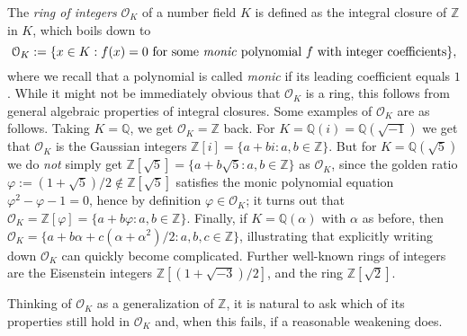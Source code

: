 \documentclass[a4paper,USenglish,cleveref, autoref, thm-restate]{lipics-v2021}
\newcommand*{\OK}[1][K]{\mathcal{O}_{#1}}
\newcommand{\Q}{\mathbb{Q}}
\newcommand{\Z}{\mathbb{Z}}
\begin{document}
The \emph{ring of integers} $\OK$ of a number field $K$ is defined as the integral closure of $\Z$ in $K$, which boils down to
\[
  \OK := \{x \in K : f(x)=0 \text{ for some \emph{monic} polynomial } f \text{ with integer coefficients}\},\]
where we recall that a polynomial is called \emph{monic} if its leading coefficient equals $1$.
While it might not be immediately obvious that $\OK$ is a ring, this follows from general algebraic properties of integral closures.
Some examples of $\OK$ are as follows. Taking $K=\Q$, we get $\OK=\Z$ back.
For $K=\Q(i)=\Q(\sqrt{-1})$ we get that $\OK$ is the Gaussian integers $\Z[i]=\{a+bi : a,b \in \Z\}$.
But for $K=\Q(\sqrt{5})$ we do \emph{not} simply get $\Z[\sqrt{5}]=\{a+b\sqrt{5} : a,b \in \Z\}$ as $\OK$, since the golden ratio $\varphi:=(1+\sqrt{5})/2\not\in \Z[\sqrt{5}]$ satisfies the monic polynomial equation $\varphi^2-\varphi-1=0$, hence by definition $\varphi \in \OK$; it turns out that $\OK=\Z[\varphi]=\{a+b\varphi : a,b \in \Z\}$. %
Finally, if $K=\Q(\alpha)$ with $\alpha$ as before, then $\OK=\{a+b \alpha+c (\alpha+\alpha^2)/2 : a,b,c \in \Z\}$, illustrating that explicitly writing down $\OK$ can quickly become complicated.
Further well-known rings of integers are %
the Eisenstein integers $\Z[(1+\sqrt{-3})/2]$, and the %
ring $\Z[\sqrt{2}]$.

Thinking of $\OK$ as a generalization of $\Z$, it is natural to ask which of its properties %
still hold in $\OK$ and, when this fails, if a reasonable weakening does. %
\end{document}
